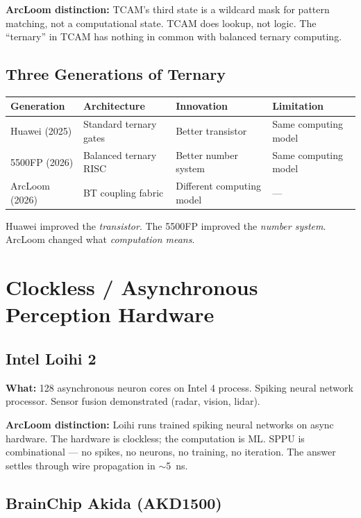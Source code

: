 \documentclass[11pt, a4paper]{article}
\begin{document}
\textbf{ArcLoom distinction:} TCAM's third state is a wildcard mask
for pattern matching, not a computational state. TCAM does lookup, not
logic. The ``ternary'' in TCAM has nothing in common with balanced
ternary computing.

\subsection{Three Generations of Ternary}

\begin{center}
\begin{tabular}{@{}llll@{}}
\toprule
\textbf{Generation} & \textbf{Architecture} & \textbf{Innovation} & \textbf{Limitation} \\
\midrule
Huawei (2025) & Standard ternary gates & Better transistor & Same computing model \\
5500FP (2026) & Balanced ternary RISC & Better number system & Same computing model \\
ArcLoom (2026) & BT coupling fabric & Different computing model & --- \\
\bottomrule
\end{tabular}
\end{center}

Huawei improved the \textit{transistor}. The 5500FP improved the
\textit{number system}. ArcLoom changed what \textit{computation means}.

\section{Clockless / Asynchronous Perception Hardware}

\subsection{Intel Loihi 2}

\textbf{What:} 128 asynchronous neuron cores on Intel 4 process.
Spiking neural network processor. Sensor fusion demonstrated
(radar, vision, lidar).

\textbf{ArcLoom distinction:} Loihi runs trained spiking neural
networks on async hardware. The hardware is clockless; the computation
is ML. SPPU is combinational --- no spikes, no neurons, no training,
no iteration. The answer settles through wire propagation in $\sim$5~ns.

\subsection{BrainChip Akida (AKD1500)}
\end{document}

